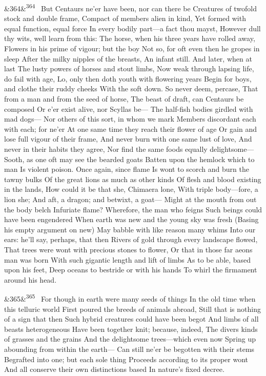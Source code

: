 \documentclass[12pt]{article}
\newcommand{\para}[1][]{\par\noindent\ifx&#1&\else\textsuperscript{\footnotesize #1}~\fi}
\begin{document}
\para[364] But Centaurs ne'er have been, nor can there be Creatures of twofold stock and double frame, Compact of members alien in kind, Yet formed with equal function, equal force In every bodily part---a fact thou mayst, However dull thy wits, well learn from this: The horse, when his three years have rolled away, Flowers in his prime of vigour; but the boy Not so, for oft even then he gropes in sleep After the milky nipples of the breasts, An infant still. And later, when at last The lusty powers of horses and stout limbs, Now weak through lapsing life, do fail with age, Lo, only then doth youth with flowering years Begin for boys, and clothe their ruddy cheeks With the soft down. So never deem, percase, That from a man and from the seed of horse, The beast of draft, can Centaurs be composed Or e'er exist alive, nor Scyllas be--- The half-fish bodies girdled with mad dogs--- Nor others of this sort, in whom we mark Members discordant each with each; for ne'er At one same time they reach their flower of age Or gain and lose full vigour of their frame, And never burn with one same lust of love, And never in their habits they agree, Nor find the same foods equally delightsome--- Sooth, as one oft may see the bearded goats Batten upon the hemlock which to man Is violent poison. Once again, since flame Is wont to scorch and burn the tawny bulks Of the great lions as much as other kinds Of flesh and blood existing in the lands, How could it be that she, Chimaera lone, With triple body---fore, a lion she; And aft, a dragon; and betwixt, a goat--- Might at the mouth from out the body belch Infuriate flame? Wherefore, the man who feigns Such beings could have been engendered When earth was new and the young sky was fresh (Basing his empty argument on new) May babble with like reason many whims Into our ears: he'll say, perhaps, that then Rivers of gold through every landscape flowed, That trees were wont with precious stones to flower, Or that in those far aeons man was born With such gigantic length and lift of limbs As to be able, based upon his feet, Deep oceans to bestride or with his hands To whirl the firmament around his head.

\para[365] For though in earth were many seeds of things In the old time when this telluric world First poured the breeds of animals abroad, Still that is nothing of a sign that then Such hybrid creatures could have been begot And limbs of all beasts heterogeneous Have been together knit; because, indeed, The divers kinds of grasses and the grains And the delightsome trees---which even now Spring up abounding from within the earth--- Can still ne'er be begotten with their stems Begrafted into one; but each sole thing Proceeds according to its proper wont And all conserve their own distinctions based In nature's fixed decree.
\end{document}
